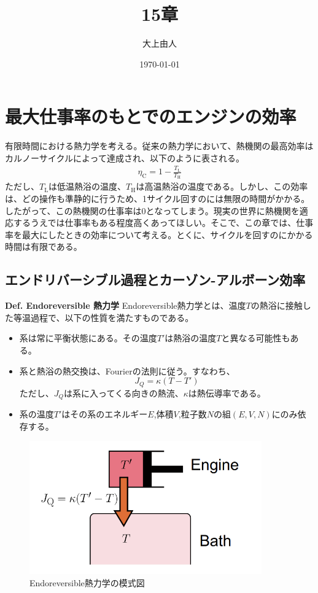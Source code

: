 \documentclass[a4paper,11pt]{jsarticle}
\numberwithin{equation}{section}
\begin{document}
\title{15章}
\author{大上由人}
\date{\today}
\maketitle
\setcounter{section}{14}

\section{最大仕事率のもとでのエンジンの効率}
有限時間における熱力学を考える。従来の熱力学において、熱機関の最高効率はカルノーサイクルによって達成され、以下のように表される。
\begin{align}
  \eta_{\text{C}} = 1 - \frac{T_{\text{L}}}{T_{\text{H}}}
\end{align}
ただし、$T_{\text{L}}$は低温熱浴の温度、$T_{\text{H}}$は高温熱浴の温度である。しかし、この効率は、どの操作も準静的に行うため、1サイクル回すのには無限の時間がかかる。
したがって、この熱機関の仕事率は0となってしまう。現実の世界に熱機関を適応するうえでは仕事率もある程度高くあってほしい。そこで、この章では、仕事率を最大にしたときの効率について考える。とくに、サイクルを回すのにかかる時間は有限である。

\subsection{エンドリバーシブル過程とカーゾン-アルボーン効率}
\begin{itembox}[l]{\textbf{Def. Endoreversible 熱力学}}
  Endoreversible熱力学とは、温度$T$の熱浴に接触した等温過程で、以下の性質を満たすものである。
  \begin{itemize}
    \item 系は常に平衡状態にある。その温度$T'$は熱浴の温度$T$と異なる可能性もある。
    \item 系と熱浴の熱交換は、Fourierの法則に従う。すなわち、
    \begin{equation}
      J_{Q} = \kappa(T-T')
    \end{equation}
    ただし、$J_{Q}$は系に入ってくる向きの熱流、$\kappa$は熱伝導率である。
    \item 系の温度$T'$はその系のエネルギー$E$,体積$V$,粒子数$N$の組$(E,V,N)$にのみ依存する。
  \end{itemize}
\end{itembox}

\begin{figure}[H]
    \begin{center}
    \includegraphics[width=100mm]{endoreversible.png}
    \end{center}
    \caption{Endoreversible熱力学の模式図}
    \label{fig:endoreversible}
\end{figure}
\end{document}

